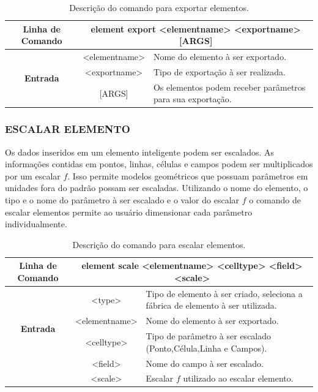 \documentclass[a4paper,12pt]{monografia}
\theoremstyle{plain}
\theoremstyle{definition}
\theoremstyle{remark}
\begin{document}
\begin{center}
\begin{table}[!htbp]
	\begin{tabular}{|c|c|m{}|}
		\hline
		\textbf{Linha de Comando} & \multicolumn{2}{c|}{element export <element\underline{\space\space}name> <export\underline{\space\space}name> [ARGS]} \\
		\hline
		\multirow{3}{*}{\textbf{Entrada}} & <element\underline{\space\space}name> & Nome do elemento à ser exportado. \\
		& <export\underline{\space\space}name> & Tipo de exportação à ser realizada. \\
		& [ARGS] & Os elementos podem receber parâmetros para sua exportação. \\
		\hline
	\end{tabular}
	\caption{Descrição do comando para exportar elementos.}
	\label{tab:export}
\end{table}
\end{center}

\subsubsection{ESCALAR ELEMENTO}\label{sec:scale_element}

Os dados inseridos em um elemento inteligente podem ser escalados. As informações contidas em pontos, linhas, células e campos podem ser multiplicados por um escalar $f$. Isso permite modelos geométricos que possuam parâmetros em unidades fora do padrão possam ser escaladas. Utilizando o nome do elemento, o tipo e o nome do parâmetro à ser escalado e o valor do escalar $f$ o comando de escalar elementos permite ao usuário dimensionar cada parâmetro individualmente.

\begin{center}
\begin{table}[!htbp]
	\begin{tabular}{|c|c|m{}|}
		\hline
		\textbf{Linha de Comando} & \multicolumn{2}{c|}{element scale <element\underline{\space\space}name> <cell\underline{\space\space}type> <field> <scale>} \\
		\hline
		\multirow{4}{*}{\textbf{Entrada}} & <type> & Tipo de elemento à ser criado, seleciona a fábrica de elemento à ser utilizada. \\
		
		& <element\underline{\space\space}name> & Nome do elemento à ser exportado. \\
		& <cell\underline{\space\space}type> & Tipo de parâmetro à ser escalado (Ponto,Célula,Linha e Campos). \\
		& <field> & Nome do campo à ser escalado. \\
		& <scale> & Escalar $f$ utilizado ao escalar elemento. \\
		\hline
	\end{tabular}
	\caption{Descrição do comando para escalar elementos.}
	\label{tab:scale_element}
\end{table}
\end{center}
\end{document}
